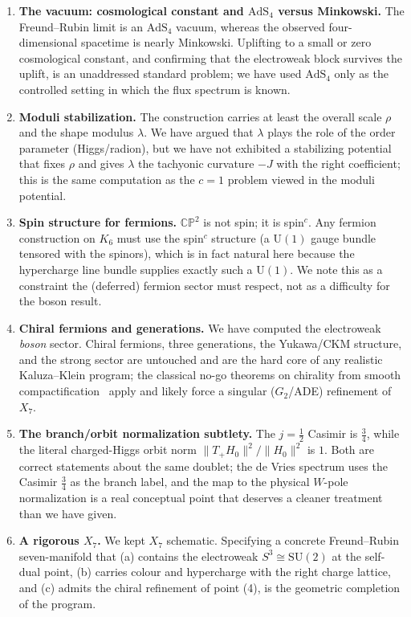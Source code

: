 \documentclass[11pt]{article}
\theoremstyle{plain}
\theoremstyle{definition}
\newcommand{\cA}{\mathcal{A}}
\newcommand{\half}{\tfrac12}
\newcommand{\SU}{\mathrm{SU}}
\newcommand{\U}{\mathrm{U}}
\newcommand{\AdS}{\mathrm{AdS}}
\begin{document}
\begin{enumerate}
construction of \emph{couplings} would more naturally yield an
$\overline{\rm MS}$-like quantity; that ours lands on the on-shell mass ratio
reflects that $\cA(J)$ is a mass operator, not a coupling operator. Making
the scheme assignment precise --- and likewise placing the
$1/\alpha=135.3$ of \eqref{eq:alpha} on a definite scale between
$\alpha(0)^{-1}=137.036$ and $\alpha(M_Z)^{-1}\approx128$ --- is open.
\item \textbf{The vacuum: cosmological constant and $\AdS_4$ versus
Minkowski.} The Freund--Rubin limit is an $\AdS_4$ vacuum, whereas the
observed four-dimensional spacetime is nearly Minkowski. Uplifting to a small
or zero cosmological constant, and confirming that the electroweak block
survives the uplift, is an unaddressed standard problem; we have used $\AdS_4$
only as the controlled setting in which the flux spectrum is known.
\item \textbf{Moduli stabilization.} The construction carries at least the
overall scale $\rho$ and the shape modulus $\lambda$. We have argued that
$\lambda$ plays the role of the order parameter (Higgs/radion), but we have
not exhibited a stabilizing potential that fixes $\rho$ and gives $\lambda$
the tachyonic curvature $-J$ with the right coefficient; this is the same
computation as the $c=1$ problem viewed in the moduli potential.
\item \textbf{Spin structure for fermions.} $\mathbb{CP}^2$ is not spin; it is
spin$^{c}$. Any fermion construction on $K_6$ must use the spin$^c$
structure (a $\U(1)$ gauge bundle tensored with the spinors), which is in
fact natural here because the hypercharge line bundle supplies exactly such a
$\U(1)$. We note this as a constraint the (deferred) fermion sector must
respect, not as a difficulty for the boson result.
\item \textbf{Chiral fermions and generations.} We have computed the
electroweak \emph{boson} sector. Chiral fermions, three generations, the
Yukawa/CKM structure, and the strong sector are untouched and are the hard
core of any realistic Kaluza--Klein program; the classical no-go theorems on
chirality from smooth compactification~\cite{Witten1981} apply and likely
force a singular ($G_2$/ADE) refinement of $X_7$.
\item \textbf{The branch/orbit normalization subtlety.} The $j=\half$
Casimir is $\tfrac34$, while the literal charged-Higgs orbit norm
$\|T_+H_0\|^2/\|H_0\|^2$ is $1$. Both are correct statements about the same
doublet; the de Vries spectrum uses the Casimir $\tfrac34$ as the branch
label, and the map to the physical $W$-pole normalization is a real
conceptual point that deserves a cleaner treatment than we have given.
\item \textbf{A rigorous $X_7$.} We kept $X_7$ schematic. Specifying a
concrete Freund--Rubin seven-manifold that (a) contains the electroweak
$S^3\cong\SU(2)$ at the self-dual point, (b) carries colour and hypercharge
with the right charge lattice, and (c) admits the chiral refinement of
point (4), is the geometric completion of the program.
\end{enumerate}
\end{document}
